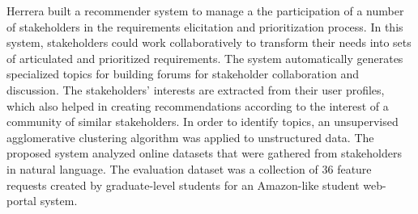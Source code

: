 Herrera \etal \cite{Castro-Herrera:2009} built a recommender system to manage a
the participation of a number of stakeholders in the requirements
elicitation and prioritization process. In this system, stakeholders could work collaboratively
to transform their needs into sets of articulated and prioritized requirements.
The system automatically generates specialized topics for building forums for
stakeholder collaboration and discussion. The stakeholders' interests are
extracted from their user profiles, which also helped in creating
recommendations according to the interest of a community of similar stakeholders. In order to identify topics, an unsupervised agglomerative
clustering algorithm was applied to unstructured data. The proposed system analyzed online datasets
that were gathered from stakeholders in natural language.
The evaluation dataset was a collection of 36 feature requests created by
graduate-level students for an Amazon-like student web-portal system.






